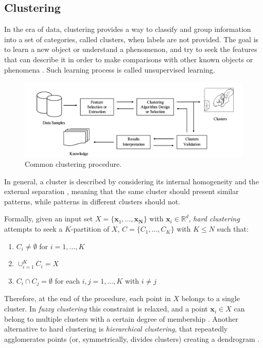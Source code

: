 \documentclass[a4paper, 12pt]{article} %
\begin{document}
	\subsection{Clustering } \label{ssec:clustering}
	In the era of data, clustering provides a way to classify and group information into a set of categories, called clusters, when labels are not provided. The goal is to learn a new object or understand a phenomenon, and try to seek the features that can describe it in order to make comparisons with other known objects or phenomena \cite{ClusteringSurvey}. Such learning process is called unsupervised learning.
	\begin{figure} \label{fig:clustering_approach}
		\includegraphics[width=\linewidth]{img/clustering_approach.png}
		\caption{Common clustering procedure.}
	\end{figure}
	In general, a cluster is described by considering its internal homogeneity and the external separation \cite{ClusterHomogeinitySeparation}, meaning that the same cluster should present similar patterns, while patterns in different clusters should not.
	
	Formally, given an input set $X = \{ \pmb{x}_1, ..., \pmb{x_N} \}$ with $\pmb{x}_i \in \mathbb{R}^d$, \textit{hard clustering} attempts to seek a $K$-partition of $X$, $C = \{ C_1, ..., C_K \}$ with $K \leq N$ such that:
	\begin{enumerate}
		 \item $C_i \neq \emptyset$ for $i = 1, ..., K$
		 \item $\cup_{i=1}^{K} C_i = X$
		 \item $C_i \cap C_j = \emptyset$ for each $i, j = 1, ..., K$ with $i \neq j$
	\end{enumerate}
	Therefore, at the end of the procedure, each point in $X$ belongs to a single cluster. In \textit{fuzzy clustering} this constraint is relaxed, and a point $\pmb{x}_i \in X$ can belong to multiple clusters with a certain degree of membership \cite{FuzzyClustering}. Another alternative to hard clustering is \textit{hierarchical clustering}, that repeatedly agglomerates points (or, symmetrically, divides clusters) creating a dendrogram \cite{HierarchicalClustering}.  
	
\end{document}
